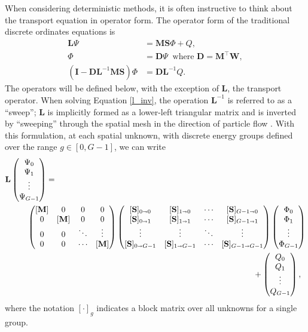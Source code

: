 \documentclass{article} %
\newcommand{\sa}{\shortrightarrow}
\newcommand{\ve}[1]{\ensuremath{\mathbf{#1}}}
\newcommand{\fq}{\qquad\qquad\qquad\qquad}
\begin{document}
When considering deterministic methods, it is often instructive to think about
the transport equation in operator form. The 
operator form of the traditional discrete ordinates equations is
%
\begin{align}
\ve{L}\Psi &= \ve{MS}\Phi + Q, \\
\Phi &= \ve{D}\Psi\: \text{ where } \ve{D} = \ve{M}^\top\ve{W}, \\
\left(\ve{I} - \ve{DL}^{-1}\ve{MS}\right)\Phi &= \ve{DL}^{-1}Q.
\label{l_inv}
\end{align}
%
The operators will be defined below, with the exception of $\ve{L}$,
the transport operator. When solving Equation \eqref{l_inv}, the operation
$\ve{L}^{-1}$ is referred to as a ``sweep''; $\ve{L}$ is implicitly formed as a
lower-left triangular matrix and is inverted by ``sweeping'' through the
spatial mesh in the direction of particle flow \cite{exmm}.
With this formulation, at each spatial unknown, with discrete energy groups
defined over the range $g\in[0,G-1]$, we can write
%
\begin{align}
    \ve{L}
    &\begin{pmatrix}
      \Psi_0 \\
      \Psi_1 \\
      \vdots   \\
      \Psi_{G-1}  \nonumber
    \end{pmatrix} = \\
    &\qquad\begin{pmatrix}
      [\ve{M}] & 0 & 0 & 0 \\
      0 & [\ve{M}] & 0 & 0 \\
      0 & 0 & \ddots & \vdots \\
      0 & 0 & \cdots & [\ve{M}] \\
    \end{pmatrix}
    \begin{pmatrix}
      [\ve{S}]_{0\sa0} & [\ve{S}]_{1\sa0} & \cdots & [\ve{S}]_{G-1\sa0} \\
      [\ve{S}]_{0\sa1} & [\ve{S}]_{1\sa1} & \cdots & [\ve{S}]_{G-1\sa1} \\
      \vdots & \vdots & \ddots & \vdots \\
      [\ve{S}]_{0\sa G-1} & [\ve{S}]_{1\sa G-1} & \cdots & [\ve{S}]_{G-1\sa G-1}
    \end{pmatrix}
    \begin{pmatrix}
      \Phi_0 \\
      \Phi_1 \\
      \vdots   \\
      \Phi_{G-1}
    \end{pmatrix}
    \\&\fq\fq\fq\qquad\qquad\qquad+
    \begin{pmatrix}
      Q_0 \\
      Q_1 \\
      \vdots  \\
      Q_{G-1}
    \end{pmatrix}, \nonumber
    \label{eq:matrix-transport}
\end{align}
%
where the notation $[\cdot]_g$ indicates a block matrix over all
unknowns for a single group.  
\end{document}
